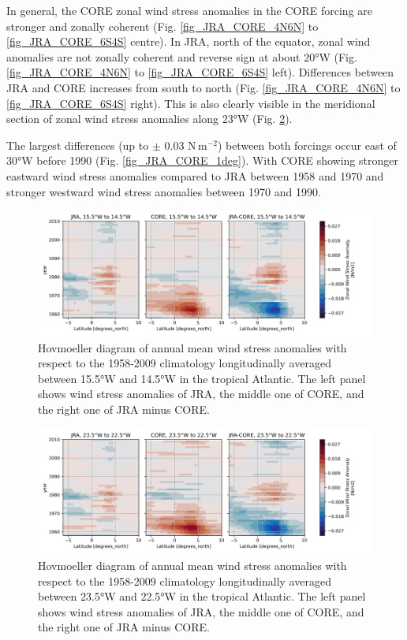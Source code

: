 \documentclass[a4paperpaper,]{article}
\begin{document}
In general, the CORE zonal wind stress anomalies in the CORE forcing are
stronger and zonally coherent (Fig. \ref{fig_JRA_CORE_4N6N} to
\ref{fig_JRA_CORE_6S4S} centre). In JRA, north of the equator, zonal
wind anomalies are not zonally coherent and reverse sign at about 20°W
(Fig. \ref{fig_JRA_CORE_4N6N} to \ref{fig_JRA_CORE_6S4S} left).
Differences between JRA and CORE increases from south to north (Fig.
\ref{fig_JRA_CORE_4N6N} to \ref{fig_JRA_CORE_6S4S} right). This is also
clearly visible in the meridional section of zonal wind stress anomalies
along 23°W (Fig. \ref{fig_JRA_CORE_taux_23w}).

The largest differences (up to \(\pm\) 0.03 N\(\,\)m\(^{-2}\)) between
both forcings occur east of 30°W before 1990 (Fig.
\ref{fig_JRA_CORE_1deg}). With CORE showing stronger eastward wind
stress anomalies compared to JRA between 1958 and 1970 and stronger
westward wind stress anomalies between 1970 and 1990.

\begin{figure}
\centering
\includegraphics{./figures/INALT20_wind_forcing_comparison/INALT_JRA_CORE_taux_anomaly_hovm_merid_6s6n_15p5w14p5w.png}
\caption{Hovmoeller diagram of annual mean wind stress anomalies with
respect to the 1958-2009 climatology longitudinally averaged between
15.5°W and 14.5°W in the tropical Atlantic. The left panel shows wind
stress anomalies of JRA, the middle one of CORE, and the right one of
JRA minus CORE. \label{fig_JRA_CORE_taux_15w}}
\end{figure}

\begin{figure}
\centering
\includegraphics{./figures/INALT20_wind_forcing_comparison/INALT_JRA_CORE_taux_anomaly_hovm_merid_6s6n_23p5w22p5w.png}
\caption{Hovmoeller diagram of annual mean wind stress anomalies with
respect to the 1958-2009 climatology longitudinally averaged between
23.5°W and 22.5°W in the tropical Atlantic. The left panel shows wind
stress anomalies of JRA, the middle one of CORE, and the right one of
JRA minus CORE. \label{fig_JRA_CORE_taux_23w}}
\end{figure}
\end{document}
